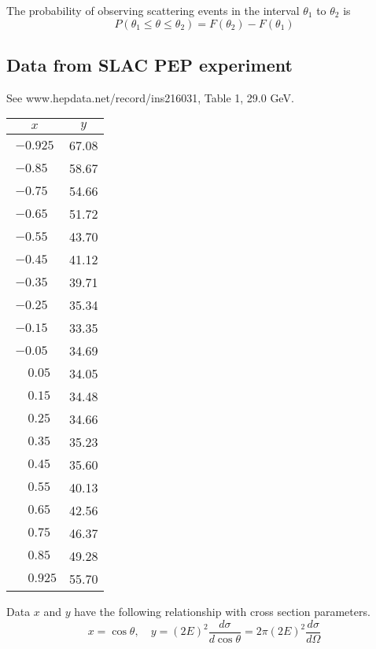 \documentclass[12pt]{article}
\begin{document}
The probability of observing scattering events in the interval $\theta_1$ to $\theta_2$ is
\begin{equation*}
P(\theta_1\le\theta\le\theta_2)=F(\theta_2)-F(\theta_1)
\end{equation*}

\subsection*{Data from SLAC PEP experiment}
See www.hepdata.net/record/ins216031, Table 1, 29.0 GeV.

\begin{center}
\begin{tabular}{|c|c|}
\hline
$x$ & $y$\\
\hline
$-0.925$ & 67.08\\
$-0.85\phantom{0}$ & 58.67\\
$-0.75\phantom{0}$ & 54.66\\
$-0.65\phantom{0}$ & 51.72\\
$-0.55\phantom{0}$ & 43.70\\
$-0.45\phantom{0}$ & 41.12\\
$-0.35\phantom{0}$ & 39.71\\
$-0.25\phantom{0}$ & 35.34\\
$-0.15\phantom{0}$ & 33.35\\
$-0.05\phantom{0}$ & 34.69\\
$\phantom{+}0.05\phantom{0}$ & 34.05\\
$\phantom{+}0.15\phantom{0}$ & 34.48\\
$\phantom{+}0.25\phantom{0}$ & 34.66\\
$\phantom{+}0.35\phantom{0}$ & 35.23\\
$\phantom{+}0.45\phantom{0}$ & 35.60\\
$\phantom{+}0.55\phantom{0}$ & 40.13\\
$\phantom{+}0.65\phantom{0}$ & 42.56\\
$\phantom{+}0.75\phantom{0}$ & 46.37\\
$\phantom{+}0.85\phantom{0}$ & 49.28\\
$\phantom{+}0.925$ & 55.70\\
\hline
\end{tabular}
\end{center}

Data $x$ and $y$ have the following relationship with cross section parameters.
\begin{equation*}
x=\cos\theta,
\quad
y=(2E)^2\frac{d\sigma}{d\cos\theta}=2\pi(2E)^2\frac{d\sigma}{d\Omega}
\end{equation*}
\end{document}
